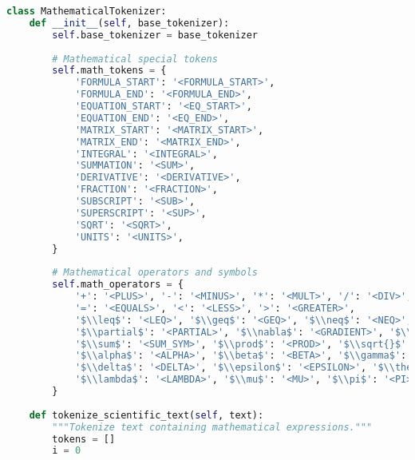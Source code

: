 \begin{lstlisting}[language=Python, caption=Mathematical formula tokenization system]
class MathematicalTokenizer:
    def __init__(self, base_tokenizer):
        self.base_tokenizer = base_tokenizer
        
        # Mathematical special tokens
        self.math_tokens = {
            'FORMULA_START': '<FORMULA_START>',
            'FORMULA_END': '<FORMULA_END>',
            'EQUATION_START': '<EQ_START>',
            'EQUATION_END': '<EQ_END>',
            'MATRIX_START': '<MATRIX_START>',
            'MATRIX_END': '<MATRIX_END>',
            'INTEGRAL': '<INTEGRAL>',
            'SUMMATION': '<SUM>',
            'DERIVATIVE': '<DERIVATIVE>',
            'FRACTION': '<FRACTION>',
            'SUBSCRIPT': '<SUB>',
            'SUPERSCRIPT': '<SUP>',
            'SQRT': '<SQRT>',
            'UNITS': '<UNITS>',
        }
        
        # Mathematical operators and symbols
        self.math_operators = {
            '+': '<PLUS>', '-': '<MINUS>', '*': '<MULT>', '/': '<DIV>',
            '=': '<EQUALS>', '<': '<LESS>', '>': '<GREATER>',
            '$\\leq$': '<LEQ>', '$\\geq$': '<GEQ>', '$\\neq$': '<NEQ>',
            '$\\partial$': '<PARTIAL>', '$\\nabla$': '<GRADIENT>', '$\\int$': '<INTEGRAL_SYM>',
            '$\\sum$': '<SUM_SYM>', '$\\prod$': '<PROD>', '$\\sqrt{}$': '<SQRT_SYM>',
            '$\\alpha$': '<ALPHA>', '$\\beta$': '<BETA>', '$\\gamma$': '<GAMMA>',
            '$\\delta$': '<DELTA>', '$\\epsilon$': '<EPSILON>', '$\\theta$': '<THETA>',
            '$\\lambda$': '<LAMBDA>', '$\\mu$': '<MU>', '$\\pi$': '<PI>', '$\\sigma$': '<SIGMA>',
        }
    
    def tokenize_scientific_text(self, text):
        """Tokenize text containing mathematical expressions."""
        tokens = []
        i = 0
        

\end{lstlisting}
